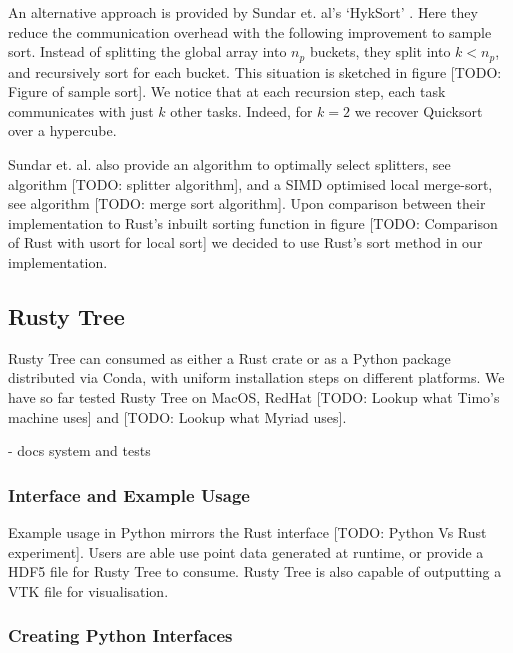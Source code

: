 An alternative approach is provided by Sundar et. al's `HykSort' \cite{sundar2013hyksort}. Here they reduce the communication overhead with the following improvement to sample sort. Instead of splitting the global array into $n_p$ buckets, they split into $k < n_p$, and recursively sort for each bucket. This situation is sketched in figure [TODO: Figure of sample sort]. We notice that at each recursion step, each task communicates with just $k$ other tasks. Indeed, for $k=2$ we recover Quicksort over a hypercube. 

Sundar et. al. also provide an algorithm to optimally select splitters, see algorithm [TODO: splitter algorithm], and a SIMD optimised local merge-sort, see algorithm [TODO: merge sort algorithm]. Upon comparison between their implementation to Rust's inbuilt sorting function in figure [TODO: Comparison of Rust with usort for local sort] we decided to use Rust's sort method in our implementation.

\subsection*{Rusty Tree}

Rusty Tree can consumed as either a Rust crate or as a Python package distributed via Conda, with uniform installation steps on different platforms. We have so far tested Rusty Tree on MacOS, RedHat [TODO: Lookup what Timo's machine uses] and [TODO: Lookup what Myriad uses].

- docs system and tests


\subsubsection*{Interface and Example Usage}

Example usage in Python mirrors the Rust interface [TODO: Python Vs Rust experiment]. Users are able use point data generated at runtime, or provide a HDF5 file for Rusty Tree to consume. Rusty Tree is also capable of outputting a VTK file for visualisation.

\subsubsection*{Creating Python Interfaces}

